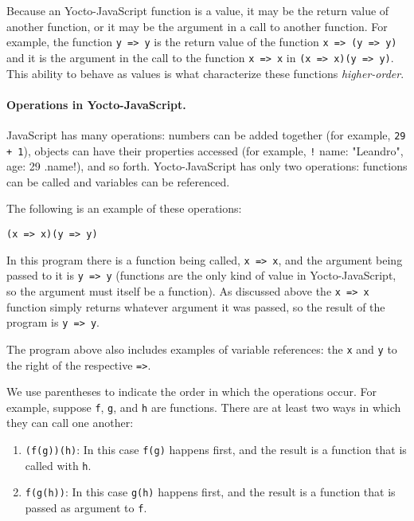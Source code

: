 \documentclass[12pt, oneside]{book}
\begin{document}
Because an Yocto-JavaScript function is a value, it may be the return value of another function, or it may be the argument in a call to another function. For example, the function \texttt{y => y} is the return value of the function \texttt{x => (y => y)} and it is the argument in the call to the function \texttt{x => x} in \texttt{(x => x)(y => y)}. This ability to behave as values is what characterize these functions \emph{higher-order}.

\paragraph{Operations in Yocto-JavaScript.}

JavaScript has many operations: numbers can be added together (for example, \texttt{29 + 1}), objects can have their properties accessed (for example, \texttt!{ name: "Leandro", age: 29 }.name!), and so forth. Yocto-JavaScript has only two operations: functions can be called and variables can be referenced.

The following is an example of these operations:

\begin{verbatim}
(x => x)(y => y)
\end{verbatim}

In this program there is a function being called, \texttt{x => x}, and the argument being passed to it is \texttt{y => y} (functions are the only kind of value in Yocto-JavaScript, so the argument must itself be a function). As discussed above the \texttt{x => x} function simply returns whatever argument it was passed, so the result of the program is \texttt{y => y}.

The program above also includes examples of variable references: the \texttt{x} and \texttt{y} to the right of the respective \texttt{=>}.

We use parentheses to indicate the order in which the operations occur. For example, suppose \texttt{f}, \texttt{g}, and \texttt{h} are functions. There are at least two ways in which they can call one another:

\begin{enumerate}
\item \texttt{(f(g))(h)}: In this case \texttt{f(g)} happens first, and the result is a function that is called with \texttt{h}.

\item \texttt{f(g(h))}: In this case \texttt{g(h)} happens first, and the result is a function that is passed as argument to \texttt{f}.
\end{enumerate}
\end{document}
